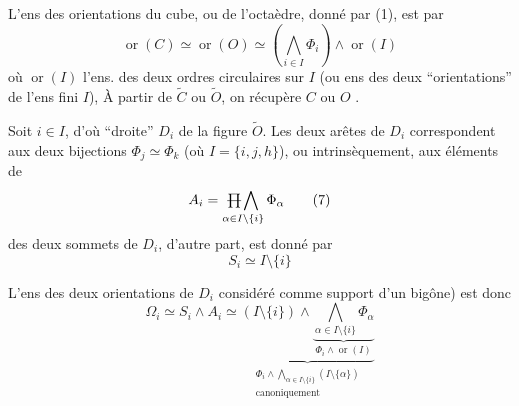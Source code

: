 
L'ens des orientations du cube, ou de l'octaèdre, donné par (1), est    par
\[
 \operatorname{or}(C)\simeq\operatorname{or}(O)\simeq
 \left(\bigwedge_{i\in I}\Phi_i\right)\wedge\operatorname{or}(I)\tag*{(6)}
\]
où $\operatorname{or}(I)$  l'ens. des deux ordres circulaires sur $I$ (ou ens des deux ``orientations'' de l'ens fini $I$),
À partir de $\widetilde C$ ou $\widetilde O$, on récupère $C$ ou $O$  .

Soit $i\in I$, d'où ``droite'' $D_i$ de la figure $\widetilde O$. Les deux arêtes de $D_i$ correspondent aux deux bijections $\Phi_j\simeq\Phi_k$ (où $I=\{i,j,h\}$), ou intrinsèquement, aux éléments de
\[
 A_i=\mathop{\deleted{\prod}\bigwedge}_{\alpha\in I\setminus\{i\}}\Phi_\alpha\tag*{(7)}
\]
  des deux sommets de $D_i$, d'autre part,
est donné par
\[
 S_i\simeq I\setminus\{i\}\tag*{(8)}
\]

L'ens des deux orientations de $D_i$ considéré comme support d'un bigône) est donc
\[
 \Omega_i\simeq S_i\wedge A_i\simeq
 \underbrace{(I\setminus\{i\})\wedge
 \underbrace{\bigwedge_{\alpha\in I\setminus\{i\}}\Phi_\alpha}_{\Phi_i\wedge\operatorname{or}(I)}}
 _{\substack{\Phi_i\wedge\bigwedge_{\alpha\in I\setminus\{i\}}(I\setminus\{\alpha\})\\\text{canoniquement}}}\tag*{(9)}
\]

